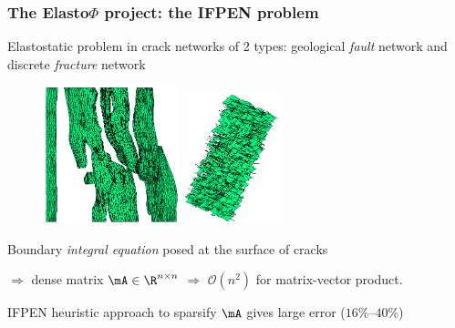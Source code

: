 \begin{frame}
\frametitle{The Elasto$\Phi$ project: the IFPEN problem} 

Elastostatic problem in \alert{crack networks} of 2 types:  geological \emph{fault} network and discrete \emph{fracture} network 

\vspace{-5pt}

\begin{figure}
\centering
\includegraphics[width=0.35\textwidth]{../images/visu_maillage5364FracsTriangles.png} \quad
\includegraphics[width=0.25\textwidth]{../images/visu_maillage1994Fracs.png}
\end{figure}

Boundary \emph{integral equation} posed at the surface of cracks

$\Rightarrow$ \alert{dense matrix} $\mA\in \R^{n\times n}$
$\Rightarrow$ $\mathcal{O}(n^{2})$ for matrix-vector product.

\medskip
IFPEN heuristic approach to sparsify $\mA$ gives large error ($16$\%--$40$\%)

\end{frame}


